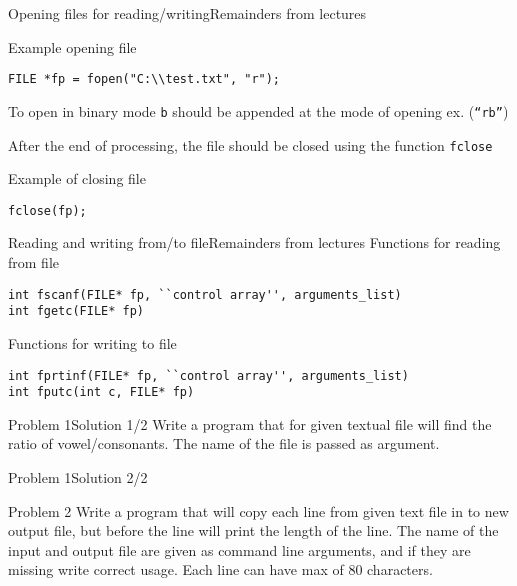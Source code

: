 \begin{frame}[fragile]{Opening files for reading/writing}{Remainders from
lectures}

\begin{exampleblock}{Example opening file}
\begin{lstlisting}
FILE *fp = fopen("C:\\test.txt", "r");
\end{lstlisting}
\begin{scriptsize}
To open in binary mode \texttt{b} should be appended at the mode of opening ex.
(\texttt{``rb''})
\end{scriptsize}
\end{exampleblock}
After the end of processing, the file should be closed using the function \texttt{fclose}
\begin{exampleblock}{Example of closing file}
\begin{lstlisting}
fclose(fp);
\end{lstlisting}
\end{exampleblock}
\end{frame}

\begin{frame}[fragile]{Reading and writing from/to
file}{Remainders from
lectures} 
Functions for reading from file
\begin{lstlisting}
int fscanf(FILE* fp, ``control array'', arguments_list)
int fgetc(FILE* fp)
\end{lstlisting}

Functions for writing to file
\begin{lstlisting}
int fprtinf(FILE* fp, ``control array'', arguments_list)
int fputc(int c, FILE* fp)
\end{lstlisting}

\end{frame}


\begin{frame}[fragile]{Problem 1}{Solution 1/2}
Write a program that for given textual file will find the ratio of
vowel/consonants. The name of the file is passed as argument.

\end{frame}

\begin{frame}[fragile]{Problem 1}{Solution 2/2}

\end{frame}

\begin{frame}{Problem 2}
Write a program that will copy each line from given text file in to new output
file, but before the line will print the length of the line. The name of the
input and output file are given as command line arguments, and if they are
missing write correct usage. Each line can have max of 80 characters.
\end{frame}

